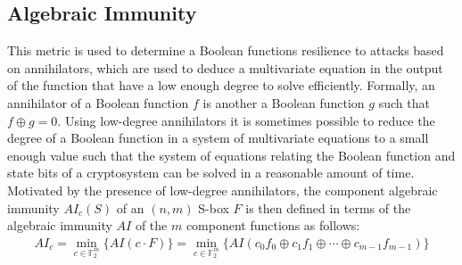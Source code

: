 \subsection{Algebraic Immunity}
This metric is used to determine a Boolean functions resilience to attacks based on annihilators, which are used to deduce a multivariate equation in the output of the function that have a low enough degree to solve efficiently. Formally, an annihilator of a Boolean function $f$ is another a Boolean function $g$ such that $f \oplus g = 0$. Using low-degree annihilators it is sometimes possible to reduce the degree of a Boolean function in a system of multivariate equations to a small enough value such that the system of equations relating the Boolean function and state bits of a cryptosystem can be solved in a reasonable amount of time. Motivated by the presence of low-degree annihilators, the component algebraic immunity $AI_c(S)$ of an $(n,m)$ S-box $F$ is then defined in terms of the algebraic immunity $AI$ of the $m$ component functions as follows: 
\begin{align*}
AI_c = \min_{c \in \mathbb{F}_2^m}\{AI(c \cdot F)\} = \min_{c \in \mathbb{F}_2^m}\{AI(c_0f_0 \oplus c_1f_1 \oplus \dotsb \oplus c_{m-1}f_{m-1})\} 
\end{align*}
